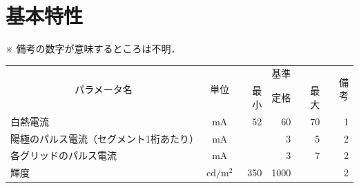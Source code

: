 \documentclass[12pt]{jarticle}
\begin{document}
\section{基本特性}

※ 備考の数字が意味するところは不明．

\begin{table}[h]
    \centering
    \begin{tabular}{|l|c|r|r|r|r|} \hline
        \multicolumn{1}{|c|}{\multirow{2}{*}{パラメータ名}} & \multirow{2}{*}{単位} & \multicolumn{3}{c|}{基準} & \multirow{2}{*}{備考} \\ \cline{3-5}
        & & 最小 & 定格 & 最大 & \\ \hline \hline
        白熱電流 & mA & 52 & 60 & 70 & 1 \\ \hline
        陽極のパルス電流（セグメント1桁あたり） & mA & & 3 & 5 & 2 \\ \hline
        各グリッドのパルス電流 & mA & & 3 & 7 & 2 \\ \hline
        輝度 & \(\mathrm{cd/m^2}\) & 350 & 1000 & & 2 \\ \hline
    \end{tabular}
\end{table}
\end{document}
